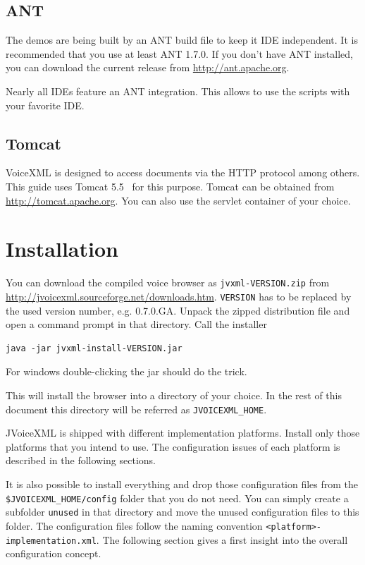 \documentclass[11pt,a4paper]{article}
\begin{document}
\subsection{ANT}
\label{sec:ant}

The demos are being built by an ANT build file to keep it IDE independent. It is
recommended that you use at least ANT 1.7.0. 
If you don't have ANT installed, you can download the current release
from \url{http://ant.apache.org}.

Nearly all IDEs feature an ANT integration. This allows to use the scripts with
your favorite IDE.

\subsection{Tomcat}
\label{sec:tomcat}

VoiceXML is designed to access documents via the HTTP protocol among others. This
guide uses Tomcat 5.5~\cite{apache:tomcat} for this purpose.
 Tomcat can be obtained
from \url{http://tomcat.apache.org}. You can also use the servlet container of
your choice.


\section{Installation}

You can download the compiled voice browser as \texttt{jvxml-VERSION.zip} from 
\url{http://jvoicexml.sourceforge.net/downloads.htm}.
\texttt{VERSION} has to be replaced by the used version number, e.g. 0.7.0.GA.
Unpack the zipped distribution file and open a command prompt in that
directory. Call the installer 

\begin{lstlisting}
java -jar jvxml-install-VERSION.jar
\end{lstlisting}

For windows double-clicking the jar should do the trick. 

This will install the browser into a directory of your choice. In the rest of 
this document this directory will be referred as \lstinline{JVOICEXML_HOME}.

JVoiceXML is shipped with different implementation platforms. Install only
those platforms that you intend to use. The configuration issues of each
platform is described in the following sections.

It is also possible to install everything and drop those configuration files
from the \lstinline{$JVOICEXML_HOME/config} folder that you do not need. You
can simply create a subfolder \lstinline{unused} in that directory and move the
unused configuration files to this folder. The configuration files follow the
naming convention \lstinline{<platform>-implementation.xml}. The following
section gives a first insight into the overall configuration concept.
\end{document}
